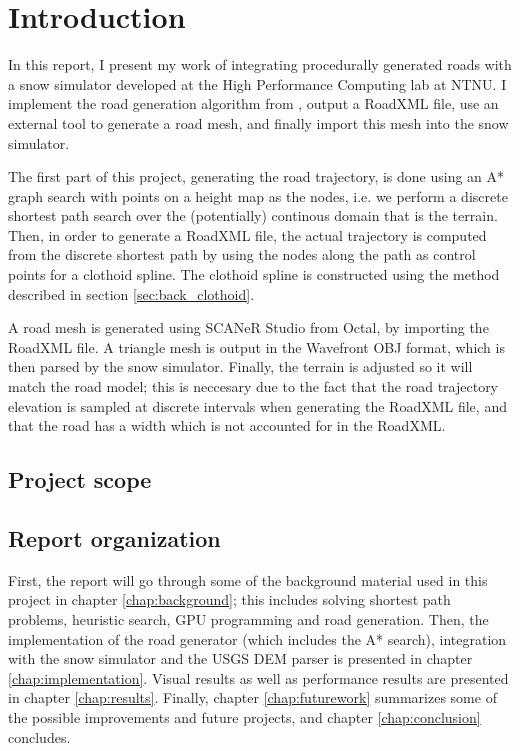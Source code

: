 \chapter{Introduction}
\label{chap:introduction}
In this report, I present my work of integrating procedurally generated roads with a snow simulator developed at the High Performance Computing lab at NTNU. I implement the road generation algorithm from \cite{roadgen}, output a RoadXML file\cite{roadxml}, use an external tool to generate a road mesh, and finally import this mesh into the snow simulator. 

The first part of this project, generating the road trajectory, is done using an A* graph search with points on a height map as the nodes, i.e. we perform a discrete shortest path search over the (potentially) continous domain that is the terrain. Then, in order to generate a RoadXML file, the actual trajectory is computed from the discrete shortest path by using the nodes along the path as control points for a clothoid spline. The clothoid spline is constructed using the method described in section \ref{sec:back_clothoid}.

A road mesh is generated using SCANeR Studio from Octal, by importing the RoadXML file. A triangle mesh is output in the Wavefront OBJ format, which is then parsed by the snow simulator. Finally, the terrain is adjusted so it will match the road model; this is neccesary due to the fact that the road trajectory elevation is sampled at discrete intervals when generating the RoadXML file, and that the road has a width which is not accounted for in the RoadXML.

\section{Project scope}
\label{sec:project-scope} 


\section{Report organization}
First, the report will go through some of the background material used in this project in chapter \ref{chap:background}; this includes solving shortest path problems, heuristic search, GPU programming and road generation. Then, the implementation of the road generator (which includes the A* search), integration with the snow simulator and the USGS DEM parser is presented in chapter \ref{chap:implementation}. Visual results as well as performance results are presented in chapter \ref{chap:results}. Finally, chapter \ref{chap:futurework} summarizes some of the possible improvements and future projects, and chapter \ref{chap:conclusion} concludes.
